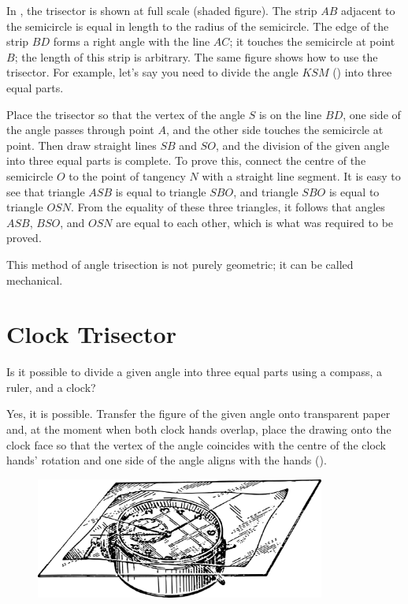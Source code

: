 In , the trisector is shown at full scale (shaded figure). The strip $AB$ adjacent to the semicircle is equal in length to the radius of the semicircle. The edge of the strip $BD$ forms a right angle with the line $AC$; it touches the semicircle at point $B$; the length of this strip is arbitrary. The same figure shows how to use the trisector. For example, let’s say you need to divide the angle $KSM$ () into three equal parts.

Place the trisector so that the vertex of the angle $S$ is on the line $BD$, one side of the angle passes through point $A$, and the other side touches the semicircle at point. Then draw straight lines $SB$ and $SO$, and the division of the given angle into three equal parts is complete. To prove this, connect the centre of the semicircle $O$ to the point of tangency $N$ with a straight line segment. It is easy to see that triangle $ASB$ is equal to triangle $SBO$, and triangle $SBO$ is equal to triangle $OSN$. From the equality of these three triangles, it follows that angles $ASB$, $BSO$, and $OSN$ are equal to each other, which is what was required to be proved.

This method of angle trisection is not purely geometric; it can be called mechanical.


\section{Clock Trisector}
\label{sec-10.5}

\ques Is it possible to divide a given angle into three equal parts using a compass, a ruler, and a clock?

\ans Yes, it is possible. Transfer the figure of the given angle onto transparent paper and, at the moment when both clock hands overlap, place the drawing onto the clock face so that the vertex of the angle coincides with the centre of the clock hands' rotation and one side of the angle aligns with the hands ().

\begin{figure}[h!]
\centering
\includegraphics[width=0.85\textwidth]{figures/ch-10/fig-148.pdf}
\end{figure}


